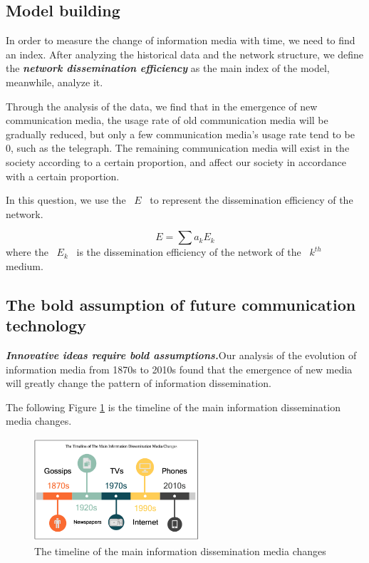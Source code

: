 \documentclass[a4paper,11pt]{article}
\begin{document}
\subsection{Model building}
\par In order to measure the change of information media with time, we need to find an index. After analyzing the historical data and the network structure, we define the \textbf{\emph{network dissemination efficiency}} as the main index of the model, meanwhile, analyze it.
\par Through the analysis of the data, we find that in the emergence of new communication media, the usage rate of old communication media will be gradually reduced, but only a few communication media's usage rate tend to be 0, such as the telegraph. The remaining communication media will exist in the society according to a certain proportion, and affect our society in accordance with a certain proportion.
\par In this question, we use the ~$E$~ to represent the dissemination efficiency of the network. 

\begin{equation}
E=\sum a_kE_k 
\end{equation}
where the ~$E_k$~ is the dissemination efficiency of the network of the ~$k^{th}$~ medium.

\subsection{The bold assumption of future communication technology}
\par \textbf{\emph{Innovative ideas require bold assumptions.}}Our analysis of the evolution of information media from 1870s to 2010s found that the emergence of new media will greatly change the pattern of information dissemination. 

\par The following Figure \ref{fig:04} is the timeline of the main information dissemination media changes.
\begin{figure}[h]%
    \centering 
    \includegraphics[width=0.55\textwidth]{./Pic/04.png}
    \caption{The timeline of the main information dissemination media changes}
    \label{fig:04}  
\end{figure}
\end{document}
